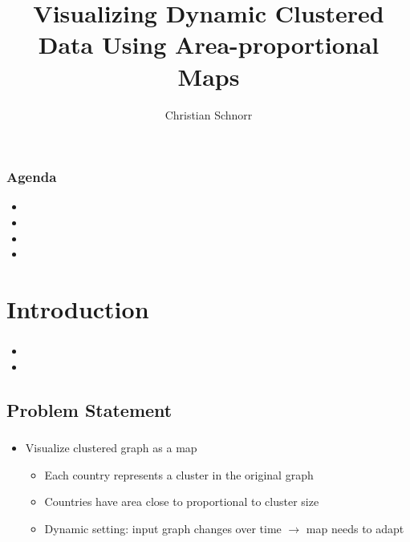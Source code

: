 \documentclass[t,18pt]{beamer}
\begin{document}
\title{Visualizing Dynamic Clustered Data Using Area-proportional Maps}
\author{Christian Schnorr}

\begin{frame}
  \titlepage
\end{frame}

\begin{frame}
  \frametitle{Agenda}
  \begin{itemize}
    \item {}
    \item {}
    \item {}
    \item {}
  \end{itemize}
\end{frame}





\section{Introduction}
\label{sect:introduction}

\begin{frame}
  \frametitle{}
  \begin{itemize}
    \item {}
    \item {}
  \end{itemize}
\end{frame}

\subsection{Problem Statement}
\label{subsect:problem-statement}

\begin{frame}
  \frametitle{}
  \begin{itemize}
    \item Visualize clustered graph as a map \begin{itemize}
      \item Each country represents a cluster in the original graph
      \item Countries have area close to proportional to cluster size
      \item Dynamic setting: input graph changes over time $\to$ map needs to adapt
    \end{itemize}
  \end{itemize}
\end{frame}
\end{document}
